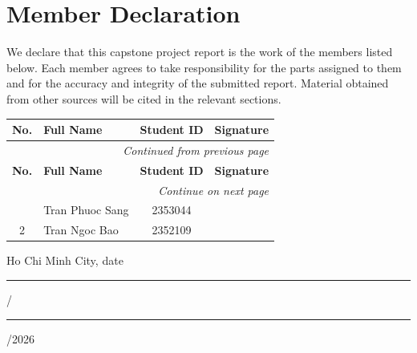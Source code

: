 \chapter*{Member Declaration}

We declare that this capstone project report is the work of the members listed
below. Each member agrees to take responsibility for the parts assigned to them
and for the accuracy and integrity of the submitted report. Material obtained
from other sources will be cited in the relevant sections.

\vspace{1cm}

\begin{longtable}{|c|p{}|c|p{3.2cm}|}
\hline
\textbf{No.} & \textbf{Full Name} & \textbf{Student ID} & \textbf{Signature} \\
\hline
\endfirsthead
\multicolumn{4}{r}{\textit{Continued from previous page}}\\[-2pt]\hline
\textbf{No.} & \textbf{Full Name} & \textbf{Student ID} & \textbf{Signature} \\
\hline
\endhead
\multicolumn{4}{r}{\textit{Continue on next page}}\\
\endfoot
\endlastfoot
1 & Tran Phuoc Sang & 2353044 & \\[1.2cm]
\hline
2 & Tran Ngoc Bao & 2352109 & \\[1.2cm]
\hline
\end{longtable}

\vfill

\begin{flushright}
Ho Chi Minh City, date \rule{1cm}{0.4pt}/\rule{1cm}{0.4pt}/2026
\end{flushright}
